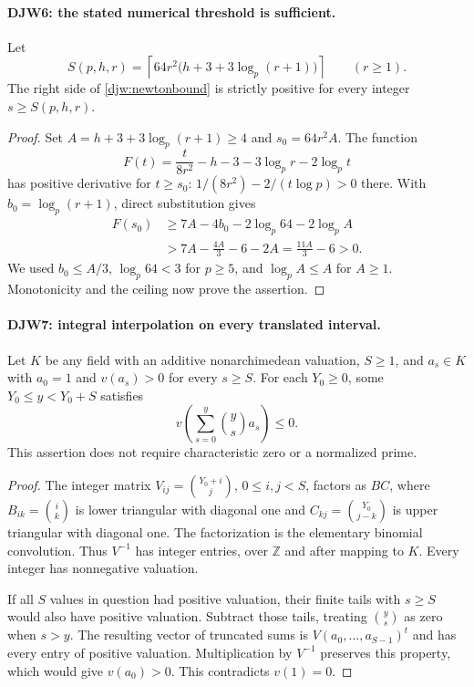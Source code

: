 \documentclass[11pt,a4paper]{article}
\numberwithin{equation}{section}
\theoremstyle{remark}\newtheorem{remark}[theorem]{Remark}
\begin{document}
\paragraph{DJW6: the stated numerical threshold is sufficient.}
\label{claim:DJW6}
Let
\begin{equation}
 S(p,h,r)=\left\lceil64r^2
          \bigl(h+3+3\log_p(r+1)\bigr)\right\rceil
          \qquad(r\ge1).
 \label{djw:windowlength}
\end{equation}
The right side of \eqref{djw:newtonbound} is strictly positive
for every integer $s\ge S(p,h,r)$.

\begin{proof}
Set $A=h+3+3\log_p(r+1)\ge4$ and $s_0=64r^2A$.
The function
\[
 F(t)=\frac{t}{8r^2}-h-3-3\log_p r-2\log_p t
\]
has positive derivative for $t\ge s_0$:
$1/(8r^2)-2/(t\log p)>0$ there.
With $b_0=\log_p(r+1)$, direct substitution gives
\begin{align*}
 F(s_0)&\ge7A-4b_0-2\log_p64-2\log_pA\\
       &>7A-\frac{4A}{3}-6-2A
        =\frac{11A}{3}-6>0.
\end{align*}
We used $b_0\le A/3$, $\log_p64<3$ for $p\ge5$, and
$\log_pA\le A$ for $A\ge1$.  Monotonicity and the ceiling
now prove the assertion.
\end{proof}

\paragraph{DJW7: integral interpolation on every translated interval.}
\label{claim:DJW7}
Let $K$ be any field with an additive nonarchimedean valuation,
$S\ge1$, and $a_s\in K$ with $a_0=1$ and $v(a_s)>0$ for
every $s\ge S$.  For each $Y_0\ge0$, some
$Y_0\le y<Y_0+S$ satisfies
\[
 v\left(\sum_{s=0}^{y}\binom ys a_s\right)\le0.
\]
This assertion does not require characteristic zero or a normalized
prime.

\begin{proof}
The integer matrix
$V_{ij}=\binom{Y_0+i}{j}$, $0\le i,j<S$, factors as $BC$,
where $B_{ik}=\binom ik$ is lower triangular with diagonal one
and $C_{kj}=\binom{Y_0}{j-k}$ is upper triangular with diagonal
one.  The factorization is the elementary binomial convolution.
Thus $V^{-1}$ has integer entries, over $\mathbb Z$ and after
mapping to $K$.  Every integer has nonnegative valuation.

If all $S$ values in question had positive valuation, their finite
tails with $s\ge S$ would also have positive valuation.  Subtract
those tails, treating $\binom ys$ as zero when $s>y$.
The resulting vector of truncated sums is
$V(a_0,\ldots,a_{S-1})^t$ and has every entry of positive valuation.
Multiplication by $V^{-1}$ preserves this property, which would
give $v(a_0)>0$.  This contradicts $v(1)=0$.
\end{proof}
\end{document}
